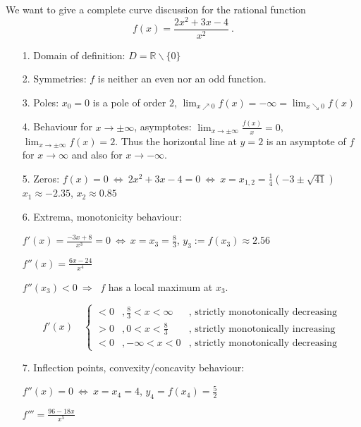  
 \whiteskip

\begin{example}
  We want to give a complete curve discussion for the rational function 
  $$f(x)=\frac{2x^2+3x-4}{x^2} \ .$$
\begin{enumerate}
    \item[1.] Domain of definition: $D=\mathbb{R}\backslash\{0\}$
 \item[2.] Symmetries: $f$ is neither an even nor an odd function.
 \item[3.] Poles: $x_0=0$ is a pole of order $2$, $\lim_{x\nearrow 0}f(x)=-\infty=\lim_{x\searrow 0}f(x)$
 \item[4.] Behaviour for $x\longrightarrow \pm\infty$, asymptotes:      
	     $\lim_{x\rightarrow\pm\infty}\frac{f(x)}{x} = 0$,
	     $\lim_{x\rightarrow\pm\infty} f(x) =2$.
            Thus the horizontal line at $y=2$ is an asymptote of $f$ for $x\longrightarrow \infty$  and also for $x\longrightarrow -\infty$.
 \item[5.] Zeros: $f(x)=0 \ \Leftrightarrow \ 2x^2+3x-4=0 \ \Leftrightarrow \  x=x_{1,2}=\frac{1}{4}(-3\pm\sqrt{41})$\\
            $x_1\approx-2.35$,  $x_2\approx 0.85$	    
 \item[6.] Extrema, monotonicity behaviour:
	    
            $f'(x)=\frac{-3x+8}{x^3}=0 \ \Leftrightarrow \ x=x_3= \frac{8}{3}$, $y_3:=f(x_3)\approx 2.56$

	    $f''(x)=\frac{6x-24}{x^4}$  
              
            $f''(x_3)<0 \ \Rightarrow \ $ $f$ has a local maximum at $x_3$.    

        \[ f'(x) \quad \left\{
 	\begin{array}{lll}
	  <0 &, \frac{8}{3} <x <\infty & \text{, strictly monotonically decreasing} \\
	  >0 &, 0<x<\frac{8}{3}        & \text{, strictly monotonically increasing} \\
	  <0 &, -\infty<x<0            & \text{, strictly monotonically decreasing} 
 	\end{array}
         \right.
         \]

 \item[7.] Inflection points, convexity/concavity behaviour:
      
      $f''(x)=0 \ \Leftrightarrow \  x=x_4=4$, $y_4=f(x_4)=\frac{5}{2}$

      $f'''=\frac{96-18x}{x^5}$ 


\end{enumerate}
\end{example}
